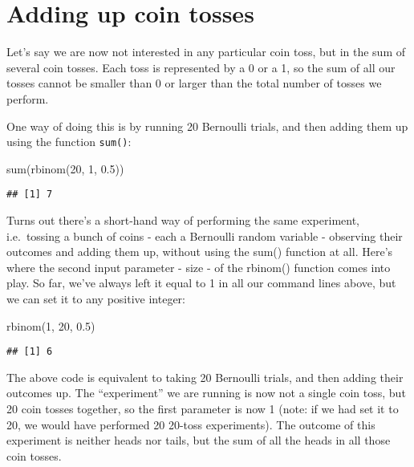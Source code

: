 \documentclass[
]{book}
\newenvironment{Shaded}{\begin{snugshade}}{\end{snugshade}}
\newcommand{\DecValTok}[1]{\textcolor[rgb]{0.00,0.00,0.81}{#1}}
\newcommand{\FloatTok}[1]{\textcolor[rgb]{0.00,0.00,0.81}{#1}}
\newcommand{\FunctionTok}[1]{\textcolor[rgb]{0.00,0.00,0.00}{#1}}
\newcommand{\NormalTok}[1]{#1}
\begin{document}
\hypertarget{adding-up-coin-tosses}{%
\section{Adding up coin tosses}\label{adding-up-coin-tosses}}

Let's say we are now not interested in any particular coin toss, but in the sum of several coin tosses. Each toss is represented by a 0 or a 1, so the sum of all our tosses cannot be smaller than 0 or larger than the total number of tosses we perform.

One way of doing this is by running 20 Bernoulli trials, and then adding them up using the function \texttt{sum()}:

\begin{Shaded}
\begin{Highlighting}[]
\FunctionTok{sum}\NormalTok{(}\FunctionTok{rbinom}\NormalTok{(}\DecValTok{20}\NormalTok{, }\DecValTok{1}\NormalTok{, }\FloatTok{0.5}\NormalTok{))}
\end{Highlighting}
\end{Shaded}

\begin{verbatim}
## [1] 7
\end{verbatim}

Turns out there's a short-hand way of performing the same experiment, i.e.~tossing a bunch of coins - each a Bernoulli random variable - observing their outcomes and adding them up, without using the sum() function at all. Here's where the second input parameter - size - of the rbinom() function comes into play. So far, we've always left it equal to 1 in all our command lines above, but we can set it to any positive integer:

\begin{Shaded}
\begin{Highlighting}[]
\FunctionTok{rbinom}\NormalTok{(}\DecValTok{1}\NormalTok{, }\DecValTok{20}\NormalTok{, }\FloatTok{0.5}\NormalTok{)}
\end{Highlighting}
\end{Shaded}

\begin{verbatim}
## [1] 6
\end{verbatim}

The above code is equivalent to taking 20 Bernoulli trials, and then adding their outcomes up. The ``experiment'' we are running is now not a single coin toss, but 20 coin tosses together, so the first parameter is now 1 (note: if we had set it to 20, we would have performed 20 20-toss experiments). The outcome of this experiment is neither heads nor tails, but the sum of all the heads in all those coin tosses.
\end{document}
